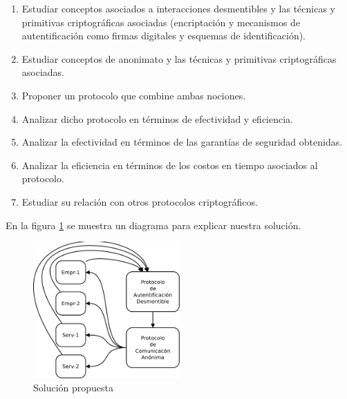 \begin{enumerate}
    \item Estudiar conceptos asociados a interacciones desmentibles y las técnicas y
          primitivas criptográficas asociadas (encriptación y mecanismos de autentificación
           como firmas digitales y esquemas de identificación).
    \item Estudiar conceptos de anonimato y las técnicas y primitivas criptográficas
          asociadas.
    \item Proponer un protocolo que combine ambas nociones.
    \item Analizar dicho protocolo en términos de efectividad y eficiencia.
    \item Analizar la efectividad en términos de las garantías de seguridad obtenidas.
    \item Analizar la eficiencia en términos de los costos en tiempo asociados al
          protocolo.
    \item Estudiar su relación con otros protocolos criptográficos.
\end{enumerate}


En la figura \ref{sigmix_simple} se muestra un diagrama para explicar nuestra solución.

\begin{figure}[hp]
    \centering
    \includegraphics[width=0.5\textwidth]{figs/sigmix_simple}
    \caption{Solución propuesta}
    \label{sigmix_simple}
\end{figure}

